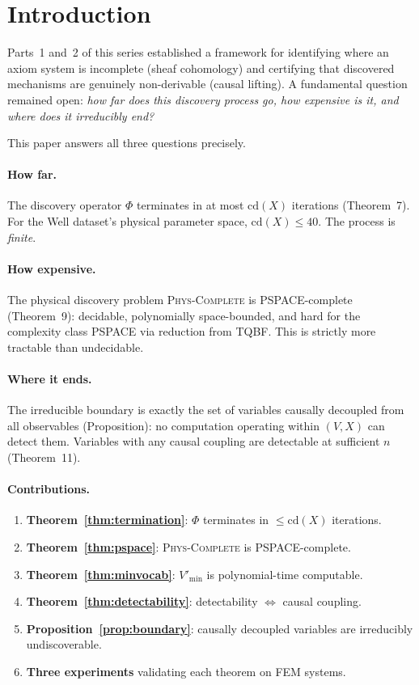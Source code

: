 \documentclass[twoside,11pt]{article}
\newcommand{\cd}{\mathrm{cd}}
\begin{document}
\section{Introduction}
\label{sec:intro}

Parts~1 and~2 of this series \citep{forgwm2026part1,forgwm2026part2}
established a framework for identifying where an axiom system is
incomplete (sheaf cohomology) and certifying that discovered mechanisms
are genuinely non-derivable (causal lifting). A fundamental question
remained open: \emph{how far does this discovery process go, how
expensive is it, and where does it irreducibly end?}

This paper answers all three questions precisely.

\paragraph{How far.}
The discovery operator $\Phi$ terminates in at most $\cd(X)$
iterations (Theorem~7). For the Well dataset's physical parameter
space, $\cd(X) \leq 40$. The process is \emph{finite}.

\paragraph{How expensive.}
The physical discovery problem \textsc{Phys-Complete} is
\textrm{PSPACE}-complete (Theorem~9): decidable, polynomially
space-bounded, and hard for the complexity class PSPACE via reduction
from TQBF. This is strictly more tractable than undecidable.

\paragraph{Where it ends.}
The irreducible boundary is exactly the set of variables causally
decoupled from all observables (Proposition): no computation
operating within $(V, X)$ can detect them. Variables with any causal
coupling are detectable at sufficient $n$ (Theorem~11).

\paragraph{Contributions.}
\begin{enumerate}[label=(\roman*)]
\item \textbf{Theorem~\ref{thm:termination}}: $\Phi$ terminates in
  $\leq \cd(X)$ iterations.
\item \textbf{Theorem~\ref{thm:pspace}}: \textsc{Phys-Complete} is
  \textrm{PSPACE}-complete.
\item \textbf{Theorem~\ref{thm:minvocab}}: $V'_{\min}$ is
  polynomial-time computable.
\item \textbf{Theorem~\ref{thm:detectability}}: detectability
  $\Leftrightarrow$ causal coupling.
\item \textbf{Proposition~\ref{prop:boundary}}: causally decoupled
  variables are irreducibly undiscoverable.
\item \textbf{Three experiments} validating each theorem on FEM systems.
\end{enumerate}
\end{document}
